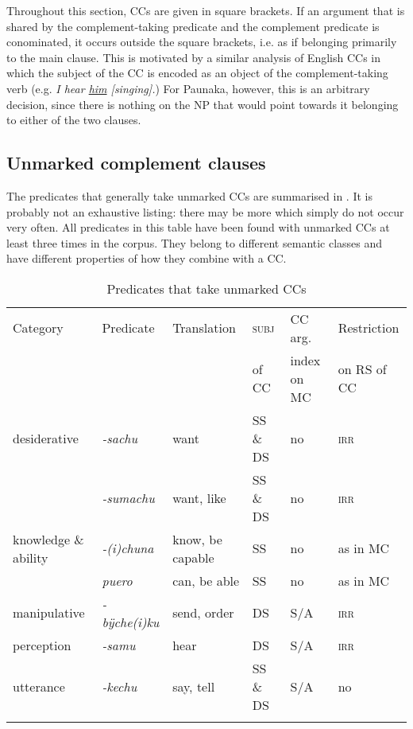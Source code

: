 Throughout this section, CCs are given in square brackets. If an argument that is shared by the complement-taking predicate and the complement predicate is conominated, it occurs outside the square brackets, i.e. as if belonging primarily to the main clause. This is motivated by a similar analysis of English CCs in which the subject of the CC is encoded as an object of the complement-taking verb (e.g. \textit{I hear \underline{him} \textup{[}singing\textup{]}.}) For Paunaka, however, this is an arbitrary decision, since there is nothing on the NP that would point towards it belonging to either of the two clauses.


\subsection{Unmarked complement clauses}\label{sec:Unmarked_CCs}

The predicates that generally take unmarked CCs are summarised in . It is probably not an exhaustive listing: there may be more which simply do not occur very often. All predicates in this table have been found with unmarked CCs at least three times in the corpus. They belong to different semantic classes and have different properties of how they combine with a CC.  

\begin{table}[htbp]
\caption{Predicates that take unmarked CCs}
\small
\begin{tabularx}{\textwidth}{QlQQQQ}
\lsptoprule
Category & Predicate & Translation & \textsc{subj} & CC arg. & Restriction \\
& & & of CC & index on MC & on RS of CC\\

\midrule
desiderative & \textit{-sachu} & want &  SS \& DS & no & \textsc{irr} \\
& \textit{-sumachu} & want, like & SS \& DS & no & \textsc{irr} \\
knowledge \& ability & \textit{-(i)chuna} & know, be capable & SS & no  & as in MC \\
 & \textit{puero} & can, be able & SS & no & as in MC\\
manipulative & \textit{-bÿche(i)ku}  & send, order & DS & S/A & \textsc{irr}\\
perception & \textit{-samu} & hear & DS & S/A &  \textsc{irr}\\
utterance & \textit{-kechu} & say, tell & SS \& DS & S/A & no \\
\lspbottomrule
\end{tabularx}

\label{table:ComplementPredicates-1}
\end{table}

